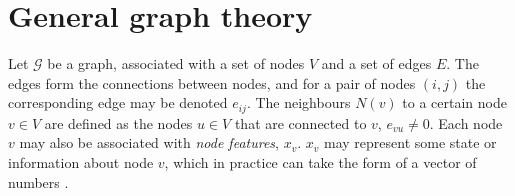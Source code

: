 





\section{General graph theory}
\label{sec:general_graph_theory}

Let $\mathcal{G}$ be a graph, associated with a set of nodes $V$ and a set of edges $E$. The edges form the connections between nodes, and for a pair of nodes $(i,j)$ the corresponding edge may be denoted $e_{ij}$. The neighbours $N(v)$ to a certain node $v \in V$ are defined as the nodes $u \in V$ that are connected to $v$, $e_{vu} \neq 0$. Each node $v$ may also be associated with \textit{node features}, $x_v$. $x_v$ may represent some state or information about node $v$, which in practice can take the form of a vector of numbers \cite{active_learning_node_classification}.

